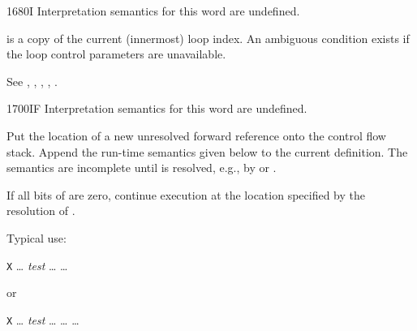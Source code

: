 \begin{worddef}{1680}{I}
\interpret
	Interpretation semantics for this word are undefined.

\execute

	 is a copy of the current (innermost) loop index.
	An ambiguous condition exists if the loop control parameters
	are unavailable.

	\begin{testing} %
		See ,
			,
			,
			,
			.
	\end{testing}
\end{worddef}


\begin{worddef}{1700}{IF}
\interpret
	Interpretation semantics for this word are undefined.

\compile

	Put the location of a new unresolved forward reference
	 onto the control flow stack. Append the run-time
	semantics given below to the current definition. The semantics
	are incomplete until  is resolved, e.g., by
	 or .

\runtime

	If all bits of  are zero, continue execution at the
	location specified by the resolution of .


	\begin{rationale} %
		Typical use:

		\tab \word{:} \texttt{X} {\ldots}
			\emph{test}  {\ldots} 
			{\ldots} \word{;}

		or

		\tab \word{:} \texttt{X} {\ldots}
			\emph{test} 
			{\ldots}  {\ldots} 
			{\ldots} \word{;}
	\end{rationale}

	\begin{testing} %
		 \\
		 \\
		 \\
		 \\
		 \\
		 \\
		 \\


\end{testing}
\end{worddef}
